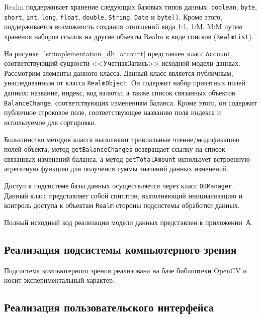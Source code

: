 Realm поддерживает хранение следующих базовых типов данных:
\texttt{boolean}, \texttt{byte}, \texttt{short}, \texttt{ìnt},
\texttt{long}, \texttt{float}, \texttt{double}, \texttt{String},
\texttt{Date} и \texttt{byte[]}.
Кроме этого, поддерживается возможность создания отношений вида
1:1, 1:M, M:M путем хранения наборов ссылок на другие объекты Realm
в виде списков (\texttt{RealmList}).

На рисунке~\ref{lst:implementation_db_account} представлен класс
\texttt{Account}, соответствующий сущности <<УчетнаяЗапись>> исходной
модели данных.
Рассмотрим элементы данного класса.
Данный класс является публичным, унаследованным от класса \texttt{RealmObject}.
Он содержит набор приватных полей данных: название, индекс, код валюты,
а также список связанных объектов \texttt{BalanceChange},
соответствующих изменениям баланса.
Кроме этого, он содержит публичное строковое поле, соответствующее
названию поля индекса и используемое для сортировки.



Большинство методов класса выполняют тривиальные чтение/модификацию
полей объекта; метод \texttt{getBalanceChanges} возвращает ссылку на
список связанных изменений баланса,
а метод \texttt{getTotalAmount} использует встроенную
агрегатную функцию для получения суммы значений данных изменений.

Доступ к подсистеме базы данных осуществляется через класс
\texttt{DBManager}. Данный класс представляет собой синглтон,
выполняющий инициализацию и контроль доступа к объектам \texttt{Realm}
стороны подсистемы обработки данных.

Полный исходный код реализации модели данных представлен в приложении~А.

\subsection{Реализация подсистемы компьютерного зрения}
\label{subsec:implementation_cv}

Подсистема компьютерного зрения реализована на базе библиотеки
OpenCV и носит экспериментальный характер.

\subsection{Реализация пользовательского интерфейса}
\label{subsec:implementation_ui}

